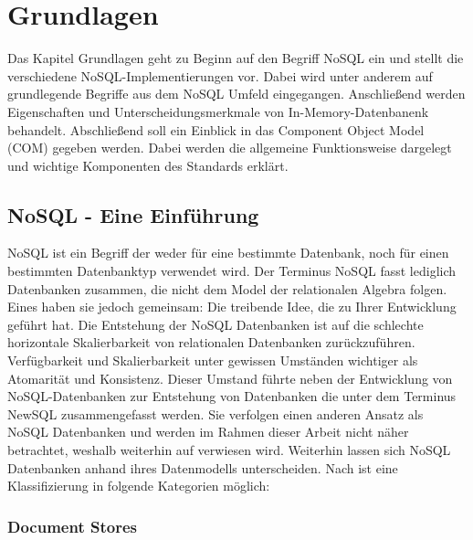 
\chapter{Grundlagen}
\label{ch:grundlagen}

Das Kapitel Grundlagen geht zu Beginn auf den Begriff NoSQL ein und stellt die verschiedene NoSQL-Implementierungen vor. Dabei wird unter anderem auf grundlegende Begriffe aus dem NoSQL Umfeld eingegangen. Anschließend werden Eigenschaften und Unterscheidungsmerkmale von In-Memory-Datenbanenk behandelt. Abschließend soll ein Einblick in das Component Object Model (COM) gegeben werden. Dabei werden die allgemeine Funktionsweise dargelegt und wichtige Komponenten des Standards erklärt.

\section{NoSQL - Eine Einführung}
\label{ch:grundlagen:sec:NoSQL}

NoSQL ist ein Begriff der weder für eine bestimmte Datenbank, noch für einen bestimmten Datenbanktyp verwendet wird. Der Terminus NoSQL fasst lediglich Datenbanken zusammen, die nicht dem Model der relationalen Algebra folgen. Eines haben sie jedoch gemeinsam: Die treibende Idee, die zu Ihrer Entwicklung geführt hat. Die Entstehung der NoSQL Datenbanken ist auf die schlechte horizontale Skalierbarkeit von relationalen Datenbanken zurückzuführen. Verfügbarkeit und Skalierbarkeit unter gewissen Umständen wichtiger als Atomarität und Konsistenz. Dieser Umstand führte neben der Entwicklung von NoSQL-Datenbanken zur Entstehung von Datenbanken die unter dem Terminus NewSQL zusammengefasst werden. Sie verfolgen einen anderen Ansatz als NoSQL Datenbanken und werden im Rahmen dieser Arbeit nicht näher betrachtet, weshalb weiterhin auf \cite{NewSQL2011} verwiesen wird. Weiterhin lassen sich NoSQL Datenbanken anhand ihres Datenmodells unterscheiden. Nach \cite{vaish2013getting} ist eine Klassifizierung in folgende Kategorien möglich:

\subsection{Document Stores}
\label{ch:grundlagen:sec:NoSQL:DocumentStores}

